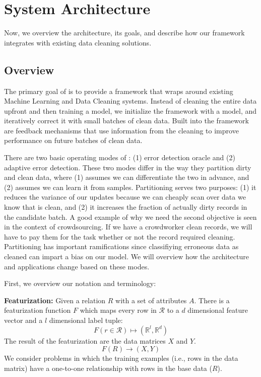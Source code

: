 \section{System Architecture}\label{arch}
Now, we overview the \sys architecture, its goals, and describe how our framework integrates with existing data cleaning solutions.

\subsection{Overview}
The primary goal of \sys is to provide a framework that wraps around existing Machine Learning and Data Cleaning systems.
Instead of cleaning the entire data upfront and then training a model, we initialize the framework with a model, and iteratively correct it with small batches of clean data.
Built into the framework are feedback mechanisms that use information from the cleaning to improve performance on future batches of clean data.

There are two basic operating modes of \sys: (1) error detection oracle and (2) adaptive error detection. 
These two modes differ in the way they partition dirty and clean data, where (1) assumes we can differentiate the two in advance, and (2) assumes we can learn it from samples.
Partitioning serves two purposes: (1) it reduces the variance of our updates because we can cheaply scan over data we know that is clean, and (2) it increases the fraction of actually dirty records in the candidate batch.
A good example of why we need the second objective is seen in the context of crowdsourcing.
If we have a crowdworker clean records, we will have to pay them for the task whether or not the record required cleaning.
Partitioning has important ramifications since classifiying erroneous data as cleaned can impart a bias on our model.
We will overview how the architecture and applications change based on these modes.

First, we overview our notation and terminology:

\vspace{0.5em}

\noindent \textbf{Featurization: } Given a relation $R$ with a set of attributes $A$.
There is a featurization function $F$ which maps every row in $\mathcal{R}$ to a $d$ dimensional feature vector and a $l$ dimensional label tuple: 
\[F(r \in \mathcal{R}) \mapsto (\mathbb{R}^l, \mathbb{R}^d)\]
The result of the featurization are the data matrices $X$ and $Y$.
\[
F(R)\rightarrow (X,Y)
\]
We consider problems in which the training examples (i.e., rows in the data matrix) have a one-to-one relationship with rows in the base data ($R$).

